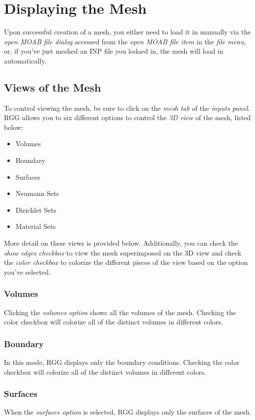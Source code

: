 \section{Displaying the Mesh}
\label{section:DisplayingMeshes}

Upon successful creation of a mesh, you either need to load it in manually via the \emph{open MOAB file dialog} accessed from the \emph{open MOAB file item} in the \emph{file menu}, or, if you've just meshed an INP file you lodaed in, the mesh will load in automatically.

\subsection{Views of the Mesh}
To control viewing the mesh, be sure to click on the \emph{mesh tab} of the \emph{inputs panel}.  RGG allows you to six different options to control the \emph{3D view} of the mesh, listed below:

\begin{itemize}
	\item{Volumes}
	\item{Boundary}
	\item{Surfaces}
	\item{Neumann Sets}
	\item{Dirichlet Sets}
	\item{Material Sets}
\end{itemize}

More detail on these views is provided below.  Additionally, you can check the \emph{show edges checkbox} to view the mesh superimposed on the 3D view and check the \emph{color checkbox} to colorize the different pieces of the view based on the option you've selected.

\subsubsection{Volumes}
Clicking the \emph{volumes option} shows all the volumes of the mesh.  Checking the color checkbox will colorize all of the distinct volumes in different colors.

\subsubsection{Boundary}
In this mode, RGG displays only the boundary conditions.  Checking the color checkbox will colorize all of the distinct volumes in different colors.

\subsubsection{Surfaces}
When the \emph{surfaces option} is selected, RGG displays only the surfaces of the mesh.


